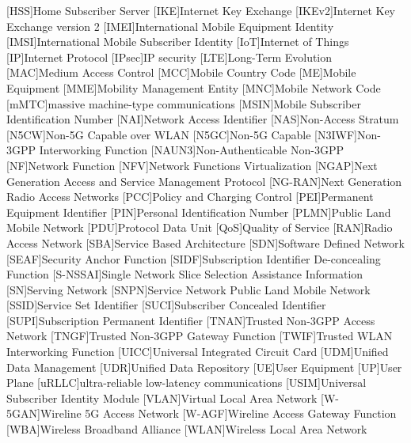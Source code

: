 \begin{acronym}[AAAAAA]
[HSS]{Home Subscriber Server}
[IKE]{Internet Key Exchange}
[IKEv2]{Internet Key Exchange version 2}
[IMEI]{International Mobile Equipment Identity}
[IMSI]{International Mobile Subscriber Identity}
[IoT]{Internet of Things}
[IP]{Internet Protocol}
[IPsec]{IP security}
[LTE]{Long-Term Evolution}
[MAC]{Medium Access Control}
[MCC]{Mobile Country Code}
[ME]{Mobile Equipment}
[MME]{Mobility Management Entity}
[MNC]{Mobile Network Code}
[mMTC]{massive machine-type communications}
[MSIN]{Mobile Subscriber Identification Number}
[NAI]{Network Access Identifier}
[NAS]{Non-Access Stratum}
[N5CW]{Non-5G Capable over WLAN}
[N5GC]{Non-5G Capable}
[N3IWF]{Non-3GPP Interworking Function}
[NAUN3]{Non-Authenticable Non-3GPP}
[NF]{Network Function}
[NFV]{Network Functions Virtualization}
[NGAP]{Next Generation Access and Service Management Protocol}
[NG-RAN]{Next Generation Radio Access Networks}
[PCC]{Policy and Charging Control}
[PEI]{Permanent Equipment Identifier}
[PIN]{Personal Identification Number}
[PLMN]{Public Land Mobile Network}
[PDU]{Protocol Data Unit}
[QoS]{Quality of Service}
[RAN]{Radio Access Network}
[SBA]{Service Based Architecture}
[SDN]{Software Defined Network}
[SEAF]{Security Anchor Function}
[SIDF]{Subscription Identifier De-concealing Function}
[S-NSSAI]{Single Network Slice Selection Assistance Information}
[SN]{Serving Network}
[SNPN]{Service Network Public Land Mobile Network}
[SSID]{Service Set Identifier}
[SUCI]{Subscriber Concealed Identifier}
[SUPI]{Subscription Permanent Identifier}
[TNAN]{Trusted Non-3GPP Access Network}
[TNGF]{Trusted Non-3GPP Gateway Function}
[TWIF]{Trusted WLAN Interworking Function}
[UICC]{Universal Integrated Circuit Card}
[UDM]{Unified Data Management}
[UDR]{Unified Data Repository}
[UE]{User Equipment}
[UP]{User Plane}
[uRLLC]{ultra-reliable low-latency communications}
[USIM]{Universal Subscriber Identity Module}
[VLAN]{Virtual Local Area Network}
[W-5GAN]{Wireline 5G Access Network}
[W-AGF]{Wireline Access Gateway Function}
[WBA]{Wireless Broadband Alliance}
[WLAN]{Wireless Local Area Network}
\end{acronym}

